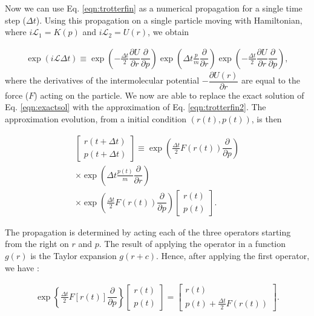 Now we can use Eq. \ref{eqn:trotterfin} as a numerical propagation for a single time step ($\Delta t$). Using this propagation on a single particle moving with Hamiltonian, where $i\mathcal{L}_{1} = K (p)$ and $i\mathcal{L}_{2} = U (r)$, we obtain

\begin{equation}
\begin{aligned}
\exp (i\mathcal{L} \Delta t)  \equiv
\exp \left (-\frac{\Delta t}{2} \dfrac{\partial U}{\partial r} \dfrac{\partial}{\partial p} \right) \exp \left( \Delta t \frac{p}{m}\dfrac{\partial }{\partial r} \right)\exp \left (-\frac{\Delta t}{2} \dfrac{\partial U}{\partial r} \dfrac{\partial}{\partial p} \right) ,
\end{aligned}
\label{eqn:trotterfin2}
\end{equation} 
where the derivatives of the intermolecular potential $-\dfrac{\partial U(r)}{\partial r}$ are equal to the force ($F$) acting on the particle. We now are able to replace the exact solution of Eq. \ref{eqn:exactsol} with the approximation of Eq. \ref{eqn:trotterfin2}. The approximation evolution, from a initial condition $(r(t),p(t))$, is then

\begin{equation}
\begin{aligned}
\left[ \begin{array}{c} r(t+ \Delta t) \\ p(t + \Delta t) \end{array} \right] \equiv 
\exp \left (\frac{\Delta t}{2} F(r(t)) \dfrac{\partial}{\partial p} \right) \\
\times \exp \left( \Delta t \frac{p(t)}{m}\dfrac{\partial }{\partial r} \right) \\
\times \exp \left (\frac{\Delta t}{2} F(r(t)) \dfrac{\partial}{\partial p} \right)
\left[ \begin{array}{c} r(t) \\ p(t) \end{array} \right] .
\end{aligned}
\end{equation}

The propagation is determined by acting each of the three operators starting from the right on $r$ and $p$. The result of applying the operator in a function $g(r)$ is the Taylor expansion $g(r+c)$. Hence,  after applying the first operator, we have  \cite{tuckerman}:

\begin{equation}
\begin{aligned}
\exp \left \lbrace \frac{\Delta t}{2} F[r(t)] \dfrac{\partial}{\partial p} \right \rbrace
\left[ \begin{array}{c} r(t) \\ p(t) \end{array} \right] = 
\left[ \begin{array}{c} r(t) \\ p(t) + \frac{\Delta t}{2} F(r(t)) \end{array} \right] .
\end{aligned}
\end{equation}

